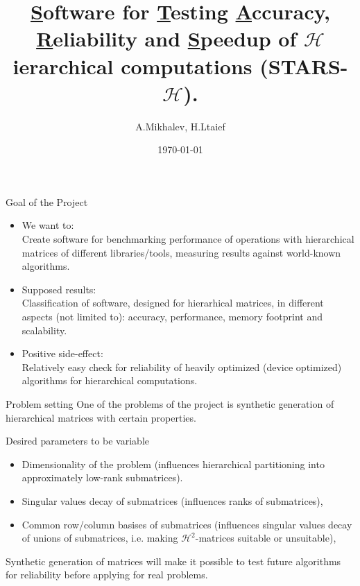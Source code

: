 \documentclass{beamer}
\title[STARS-$\mathcal{H}$]{\underline{S}oftware for \underline{T}esting
\underline{A}ccuracy, \underline{R}eliability and \underline{S}peedup of
$\mathcal{H}$ierarchical computations (STARS-$\mathcal{H}$).}
\author{A.Mikhalev, H.Ltaief}
\institute{King Abdullah University of Science and Technology}
\date{\today}
\begin{document}
\begin{frame}
\titlepage
\end{frame}

\begin{frame}{Goal of the Project}
\begin{itemize}
\item We want to:\\
Create software for benchmarking performance of operations with hierarchical
matrices of different libraries/tools, measuring results against world-known
algorithms.
\item Supposed results:\\
Classification of software, designed for hierarhical matrices, in different
aspects (not limited to): accuracy, performance, memory footprint and
scalability.
\item Positive side-effect:\\
Relatively easy check for reliability of heavily optimized (device optimized)
algorithms for hierarchical computations.
\end{itemize}
\end{frame}

\begin{frame}{Problem setting}
One of the problems of the project is synthetic generation of hierarchical
matrices with certain properties.
\begin{block}{Desired parameters to be variable}
\begin{itemize}
\item Dimensionality of the problem (influences hierarchical partitioning into
approximately low-rank submatrices).
\item Singular values decay of submatrices (influences ranks of submatrices),
\item Common row/column basises of submatrices (influences singular values
decay of unions of submatrices, i.e. making $\mathcal{H}^2$-matrices
suitable or unsuitable),
\end{itemize}
\end{block}
\begin{alertblock}{}
Synthetic generation of matrices will make it possible to test future
algorithms for reliability before applying for real problems.
\end{alertblock}
\end{frame}
\end{document}
